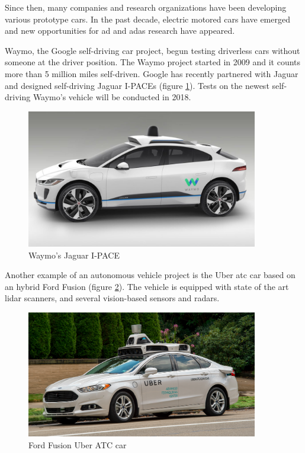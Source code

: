 Since then, many companies and research organizations have been developing various prototype cars. In the past decade, electric motored cars have emerged and new opportunities for \gls{ad} and \gls{adas} research have appeared. 

Waymo, the Google self-driving car project, begun testing driverless cars without someone at the driver position. The Waymo project started in 2009 and it counts more than 5 million miles self-driven. Google has recently partnered with Jaguar and designed self-driving Jaguar I-PACEs (figure \ref{fig:waymo}). Tests on the newest self-driving Waymo's vehicle will be conducted in 2018. \cite{Waymo}


\begin{figure}[htp]
	
	\centering
	\includegraphics[width=0.9\textwidth]{capstate/imgs/waymo}
	
	\caption{Waymo's Jaguar I-PACE}
	\label{fig:waymo}
	
\end{figure}

Another example of an autonomous vehicle project is the Uber \gls{atc} car based on an hybrid Ford Fusion (figure \ref{fig:uber}). The vehicle is equipped with state of the art \gls{lidar} scanners, and several vision-based sensors and radars.

\begin{figure}[htp]
	
	\centering
	\includegraphics[width=0.9\textwidth]{capstate/imgs/uber}
	
	\caption{Ford Fusion Uber ATC car}
	\label{fig:uber}
	
\end{figure}

